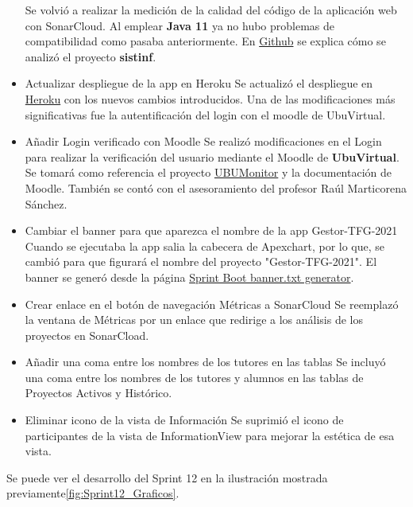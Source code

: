 \begin{itemize}
		Se volvió a realizar la medición de la calidad del código de la aplicación web con SonarCloud. Al emplear \textbf{Java 11} ya no hubo problemas de compatibilidad como pasaba anteriormente. En \href{https://github.com/dbo1001/Gestor-TFG-2021/issues/142}{Github} se explica cómo se analizó el proyecto \textbf{sistinf}.
	\item Actualizar despliegue de la app en Heroku
		Se actualizó el despliegue en \href{https://gestor-tfg-2021.herokuapp.com/}{Heroku} con los nuevos cambios introducidos. Una de las modificaciones más significativas fue la autentificación del login con el moodle de UbuVirtual.
	\item Añadir Login verificado con Moodle
		Se realizó modificaciones en el Login para realizar la verificación del usuario mediante el Moodle de \textbf{UbuVirtual}. Se tomará como referencia el proyecto \href{https://github.com/yjx0003/UBUMonitor}{UBUMonitor} y la documentación de Moodle. También se contó con el asesoramiento del profesor Raúl Marticorena Sánchez.
	\item Cambiar el banner para que aparezca el nombre de la app Gestor-TFG-2021
		Cuando se ejecutaba la app salia la cabecera de Apexchart, por lo que, se cambió para que figurará el nombre del proyecto "Gestor-TFG-2021". El banner se generó desde la página \href{https://devops.datenkollektiv.de/banner.txt/index.html}{Sprint Boot banner.txt generator}.
	\item Crear enlace en el botón de navegación Métricas a SonarCloud
		Se reemplazó la ventana de Métricas por un enlace que redirige a los análisis de los proyectos en SonarCload.
	\item Añadir una coma entre los nombres de los tutores en las tablas
		Se incluyó una coma entre los nombres de los tutores y alumnos en las tablas de Proyectos Activos y Histórico.
	\item Eliminar icono de la vista de Información
		Se suprimió el icono de participantes de la vista de InformationView para mejorar la estética de esa vista.
	
\end{itemize}

Se puede ver el desarrollo del Sprint 12 en la ilustración mostrada previamente\ref{fig:Sprint12_Graficos}.



